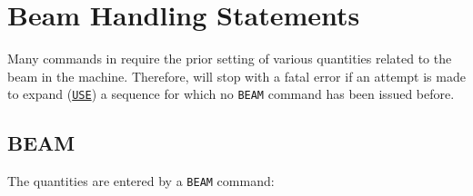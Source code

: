 \chapter{Beam Handling Statements} 
\label{chap:beam}

Many commands in \mad require the prior setting of various quantities related
to the beam in the machine. Therefore, \mad will stop with a fatal
error if an attempt is made to expand (\hyperref[sec:use]{\tt USE}) a sequence 
for which no {\tt BEAM} command has been issued before.



\section{BEAM}
\label{sec:beam}

The quantities are entered by a {\tt BEAM} command: 

